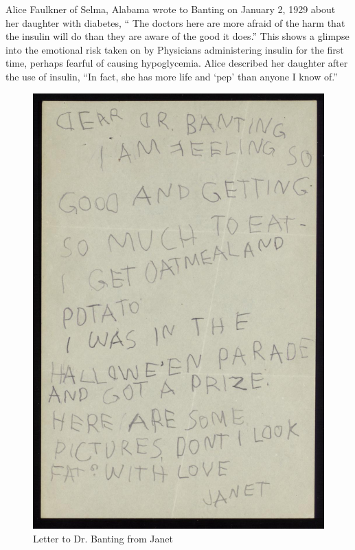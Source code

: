 \documentclass[12pt]{article}
\begin{document}
Alice Faulkner of Selma, Alabama wrote to Banting on January 2, 1929 about her daughter with diabetes, `` The doctors here are more afraid of the harm that the insulin will do than they are aware of the good it does.'' This shows a glimpse into the emotional risk taken on by Physicians administering insulin for the first time, perhaps fearful of causing hypoglycemia. Alice described her daughter after the use of insulin, ``In fact, she has more life and `pep' than anyone I know of.'' 


\begin{figure}[H]
\centering
  \includegraphics [width=5.5in]{banting_fat}
  \caption{Letter to Dr. Banting from Janet}
  \label{fig:Letter from Janet}
\end{figure}
\end{document}
